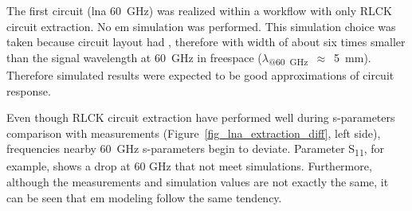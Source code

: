 
The first circuit (\gls{lna} \SI{60}{\giga\hertz}) was realized within a workflow with only RLCK circuit extraction. No \gls{em} simulation was performed. This simulation choice was taken because circuit layout had , therefore with width of about six times smaller than the signal wavelength at \SI{60}{\giga\hertz} in freespace ($\lambda$\textsubscript{@\SI{60}{\giga\hertz}}~$\approx$~\SI{5}{\milli\metre}). Therefore simulated results were expected to be good approximations of circuit response.



Even though RLCK circuit extraction have performed well during s-parameters comparison with measurements (Figure~\ref{fig_lna_extraction_diff}, left side), frequencies nearby \SI{60}{\giga\hertz} s-parameters begin to deviate. Parameter S\textsubscript{11}, for example, shows a drop at 60 GHz that not meet simulations. Furthermore, although the measurements and simulation values are not exactly the same, it can be seen that \gls{em} modeling follow the same tendency. 

